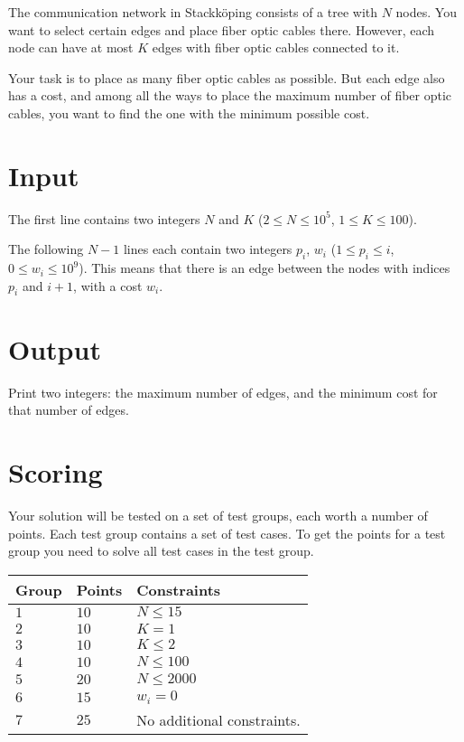 \noindent
The communication network in Stackköping consists of a tree with $N$ nodes. You want to select certain edges and place fiber optic cables there. However, each node can have at most $K$ edges with fiber optic cables connected to it.

Your task is to place as many fiber optic cables as possible. But each edge also has a cost, and among all the ways to place the maximum number of fiber optic cables, you want to find the one with the minimum possible cost.

\section*{Input}
The first line contains two integers $N$ and $K$ ($2 \leq N \leq 10^5$, $1 \leq K \leq 100$).

The following $N-1$ lines each contain two integers $p_i$, $w_i$ ($1 \leq p_i \leq i$, $0 \leq w_i \leq 10^9$).
This means that there is an edge between the nodes with indices $p_i$ and $i+1$, with a cost $w_i$.

\section*{Output}
Print two integers: the maximum number of edges, and the minimum cost for that number of edges.

\section*{Scoring}
Your solution will be tested on a set of test groups, each worth a number of points. Each test group contains
a set of test cases. To get the points for a test group you need to solve all test cases in the test group.

\noindent
\begin{tabular}{| l | l | l |}
  \hline
  \textbf{Group} & \textbf{Points} & \textbf{Constraints} \\ \hline
  $1$   & $10$       & $N \leq 15$\\ \hline
  $2$   & $10$       & $K = 1$  \\ \hline
  $3$   & $10$       & $K \leq 2$ \\ \hline
  $4$   & $10$       & $N \leq 100$ \\ \hline
  $5$   & $20$       & $N \leq 2000$ \\ \hline
  $6$   & $15$       & $w_i = 0$ \\ \hline
  $7$   & $25$       & No additional constraints. \\ \hline
\end{tabular}
